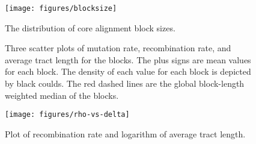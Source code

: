 \documentclass[english]{article}
\newcommand{\lyxdot}{.}
\begin{document}
\begin{figure}
\begin{center}
\texttt{[image: figures/blocksize]}
\end{center}
\caption{\label{fig:blocksize}The distribution of core alignment block sizes.}
\end{figure}
\clearpage{}%

\begin{figure}
\begin{center}


\end{center}
\caption{\label{fig:scatter3}Three scatter plots of mutation rate, recombination
rate, and average tract length for the blocks. The plus signs are mean values
for each block. The density of each value for each block is depicted by black
coulds.  The red dashed lines are the global block-length weighted median of the
blocks.}
\end{figure}
\clearpage{}%

\begin{figure}
\begin{center}
\texttt{[image: figures/rho-vs-delta]}
\end{center}
\caption{Plot of recombination rate and logarithm of average tract length.}
\label{fig:rhologdelta}
\end{figure}
\clearpage{}%
\end{document}

